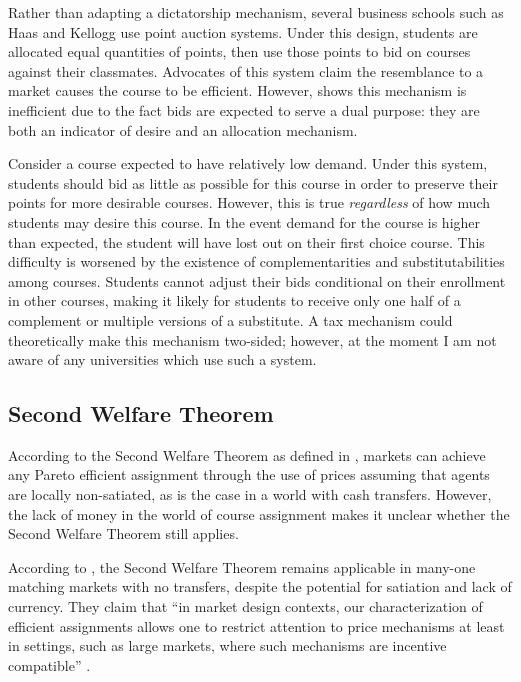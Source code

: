 \documentclass{article}
\begin{document}
Rather than adapting a dictatorship mechanism, several business schools such as Haas and Kellogg use point auction systems. Under this design, students are allocated equal quantities of points, then use those points to bid on courses against their classmates. Advocates of this system claim the resemblance to a market causes the course to be efficient. However, \textcite{sonmez2010} shows this mechanism is inefficient due to the fact bids are expected to serve a dual purpose: they are both an indicator of desire and an allocation mechanism. 

Consider a course expected to have relatively low demand. Under this system, students should bid as little as possible for this course in order to preserve their points for more desirable courses. However, this is true \emph{regardless} of how much students may desire this course. In the event demand for the course is higher than expected, the student will have lost out on their first choice course. This difficulty is worsened by the existence of complementarities and substitutabilities among courses. Students cannot adjust their bids conditional on their enrollment in other courses, making it likely for students to receive only one half of a complement or multiple versions of a substitute. A tax mechanism could theoretically make this mechanism two-sided; however, at the moment I am not aware of any universities which use such a system. 

\subsection{Second Welfare Theorem}
\label{swt}

According to the Second Welfare Theorem as defined in \textcite{arrow1951}, markets can achieve any Pareto efficient assignment through the use of prices assuming that agents are locally non-satiated, as is the case in a world with cash transfers. However, the lack of money in the world of course assignment makes it unclear whether the Second Welfare Theorem still applies.

According to \textcite{miralles2014}, the Second Welfare Theorem remains applicable in many-one matching markets with no transfers, despite the potential for satiation and lack of currency. They claim that ``in market design contexts, our characterization of efficient assignments allows one to restrict attention to price mechanisms at least in settings, such as large markets, where such mechanisms are incentive compatible'' \parencite[p. 2]{miralles2014}.
\end{document}
